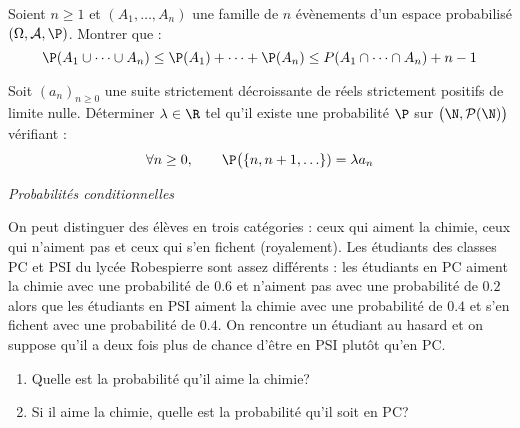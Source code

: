 \documentclass[a4paper,10pt]{report}
\begin{document}
\begin{Exa} Soient $n \geq 1$ et $(A_1, \ldots, A_n)$ une famille de $n$ évènements d'un espace probabilisé $(\Omega, \mathcal{A}, \P)$. Montrer que :
$$ \P(A_1 \cup \cdots \cup A_n) \leq \P(A_1) + \cdots + \P(A_n) \leq P(A_1 \cap \cdots \cap A_n) + n-1$$
\end{Exa}



\begin{Exa} Soit $(a_n)_{n \geq 0}$ une suite strictement décroissante de réels strictement positifs de limite nulle.  Déterminer $\lambda \in \R$ tel qu'il existe une probabilité $\P$ sur $\bigl(\N,\mathcal{P}(\N)\bigr)$ vérifiant :
    \[
    \forall n \geq 0, \qquad \P\bigl( \lbrace n, n+1, \ldots \rbrace) = \lambda a_n
    \]
\end{Exa} 




\medskip

\begin{center}
\textit{{ {\large Probabilités conditionnelles}}}
\end{center}

\medskip

\begin{Exa} On peut distinguer des élèves en trois catégories : ceux qui aiment la chimie, ceux qui n'aiment pas et ceux qui s'en fichent (royalement). Les étudiants des classes PC et PSI du lycée Robespierre sont assez différents : les étudiants en PC aiment la chimie avec une probabilité de $0.6$ et n'aiment pas avec une probabilité de $0.2$ alors que les étudiants en PSI aiment la chimie avec une probabilité de $0.4$ et s'en fichent avec une probabilité de $0.4$. On rencontre un étudiant au hasard et on suppose qu'il a deux fois plus de chance d'être en PSI plutôt qu'en PC.

\begin{enumerate}
\item Quelle est la probabilité qu'il aime la chimie?
\item Si il aime la chimie, quelle est la probabilité qu'il soit en PC?
\end{enumerate}
\end{Exa}
\end{document}
